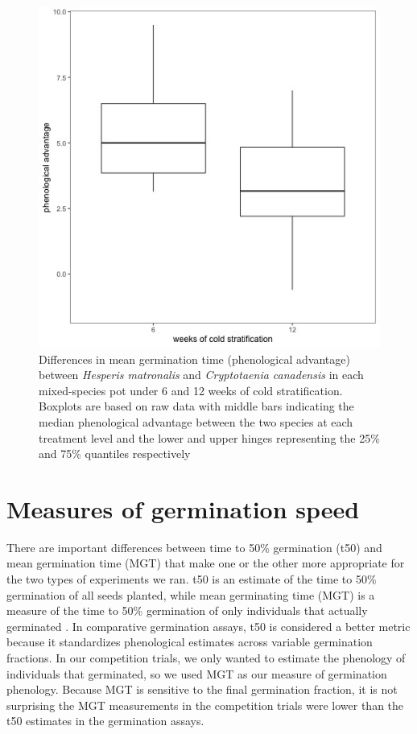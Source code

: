 \documentclass{article}
\begin{document}
\begin{figure}[hp]
    \centering
\includegraphics[width=.7\textwidth]{..//figure/priority_treat.jpeg}
   \caption{Differences in mean germination time (phenological advantage) between \textit{Hesperis matronalis} and \textit{Cryptotaenia canadensis} in each mixed-species pot under 6 and 12 weeks of cold stratification. Boxplots are based on raw data with middle bars indicating the median phenological advantage between the two species at each treatment level and the lower and upper hinges representing the 25\% and 75\% quantiles respectively} 
   \label{fig:MGTsup}
\end{figure}

\pagebreak

\section*{Measures of germination speed}
There are important differences between time to 50\% germination (t50) and mean germination time (MGT) that make one or the other more appropriate for the two types of experiments we ran. t50 is an estimate of the time to 50\% germination of all seeds planted, while mean germinating time (MGT) is a measure of the time to 50\% germination of only individuals that actually germinated \citep{Soltani:2015aa}. In comparative germination assays, t50 is considered a better metric because it standardizes phenological estimates across variable germination fractions. In our competition trials, we only wanted to estimate the phenology of individuals that germinated, so we used MGT as our measure of germination phenology. Because MGT is sensitive to the final germination fraction, it is not surprising the MGT measurements in the competition trials  were lower than the t50 estimates in the germination assays.


\end{document}
